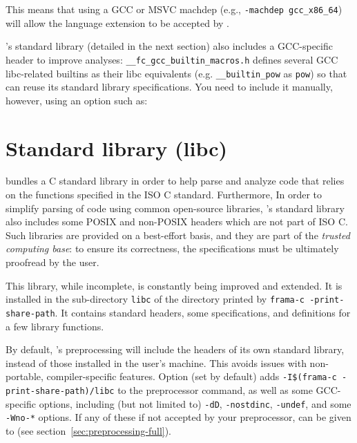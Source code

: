 This means that using a GCC or MSVC machdep (e.g., \verb+-machdep gcc_x86_64+)
will allow the language extension to be accepted by \FramaC.

\FramaC's standard library (detailed in the next section) also includes a
GCC-specific header to improve analyses:
\texttt{\_\_fc\_gcc\_builtin\_macros.h} defines several GCC libc-related
builtins as their libc equivalents (e.g. \texttt{\_\_builtin\_pow} as
\texttt{pow}) so that \FramaC can reuse its standard library specifications.
You need to include it manually, however, using an option such as:


\section{Standard library (libc)}\label{sec:libc}

\FramaC bundles a C standard library in order to help parse and analyze code
that relies on the functions specified in the ISO C standard.
Furthermore, In order to simplify parsing of code using common open-source libraries,
\FramaC's standard library also includes some POSIX and non-POSIX headers which
are not part of ISO C.
Such libraries are provided on a best-effort basis, and they are part of the
{\em trusted computing base}: to ensure its correctness, the specifications
must be ultimately proofread by the user.

This library, while incomplete, is constantly being improved and extended.
It is installed in the sub-directory \texttt{libc} of the directory printed by
\texttt{frama-c -print-share-path}. It contains standard \C headers,
some \acsl specifications, and definitions for a few library functions.

By default, \FramaC's preprocessing will include the headers of its own standard
library, instead of those installed in the user's machine. This avoids issues
with non-portable, compiler-specific features.
Option  (set by default)
adds \verb+-I$(frama-c -print-share-path)/libc+ to the preprocessor
command, as well as some GCC-specific options, including (but not limited to)
\texttt{-dD}, \texttt{-nostdinc}, \texttt{-undef}, and some \texttt{-Wno-*}
options. If any of these if not accepted by your preprocessor,
 can be given to \FramaC
(see section~\ref{sec:preprocessing-full}).

